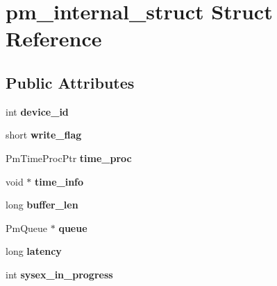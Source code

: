 \hypertarget{structpm__internal__struct}{}\section{pm\+\_\+internal\+\_\+struct Struct Reference}
\label{structpm__internal__struct}
\subsection*{Public Attributes}
\begin{DoxyCompactItemize}
\item 
\mbox{\label{structpm__internal__struct_a6434c3e3e21fad6289c32c480e13edd5}} 
int {\bfseries device\+\_\+id}
\item 
\mbox{\label{structpm__internal__struct_abea16d3f5e2dc3d0a9e1e7d02ea45be5}} 
short {\bfseries write\+\_\+flag}
\item 
\mbox{\label{structpm__internal__struct_aa2268f6b4916d4ae3de765d880bc8641}} 
Pm\+Time\+Proc\+Ptr {\bfseries time\+\_\+proc}
\item 
\mbox{\label{structpm__internal__struct_ac3ee4fe374d89f3040708206648acb07}} 
void $\ast$ {\bfseries time\+\_\+info}
\item 
\mbox{\label{structpm__internal__struct_a7da27fdc06248b08451ba5c4da24fb97}} 
long {\bfseries buffer\+\_\+len}
\item 
\mbox{\label{structpm__internal__struct_a883e467783d250a41089efa00df2bb4c}} 
Pm\+Queue $\ast$ {\bfseries queue}
\item 
\mbox{\label{structpm__internal__struct_a2c1b1573c2b74fe9f8b1bb38c8ef973b}} 
long {\bfseries latency}
\item 
\mbox{\label{structpm__internal__struct_abf9a68e60ff9e12d776af6807aa1467a}} 
int {\bfseries sysex\+\_\+in\+\_\+progress}
\item 
\mbox{\label{structpm__internal__struct_a020e2d32d420628c81216a2be3d03d3c}} 

\end{DoxyCompactItemize}
